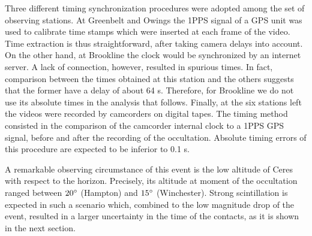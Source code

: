 \documentclass[useAMS,usenatbib]{mn2e}
\begin{document}
Three different timing synchronization procedures were adopted among the set of observing stations. At Greenbelt and Owings the 1PPS signal of a GPS unit was used to calibrate time stamps which were inserted at each frame of the video. Time extraction is thus straightforward, after taking camera delays into account. On the other hand, at Brookline the clock would be synchronized by an internet server. A lack of connection, however, resulted in spurious times. In fact, comparison between the times obtained at this station and the others suggests that the former have a delay of about 64 s. Therefore, for Brookline we do not use its absolute times in the analysis that follows. Finally, at the six stations left the videos were recorded by camcorders on digital tapes. The timing method consisted in the comparison of the camcorder internal clock to a 1PPS GPS signal, before and after the recording of the occultation. Absolute timing errors of this procedure are expected to be inferior to 0.1 s.

A remarkable observing circumstance of this event is the low altitude of Ceres with respect to the horizon. Precisely, its altitude at moment of the occultation ranged between $20\hbox{$^\circ$}$ (Hampton) and $15\hbox{$^\circ$}$ (Winchester). Strong scintillation is expected in such a scenario which, combined to the low magnitude drop of the event, resulted in a larger uncertainty in the time of the contacts, as it is shown in the next section.
\end{document}
